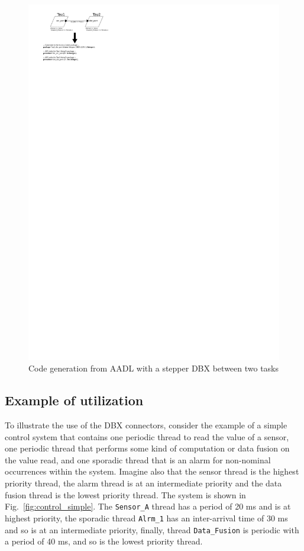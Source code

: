 \begin{figure}
\centering
\includegraphics[scale=1.8]{figs/transform}
\caption{Code generation from AADL with a stepper DBX between two
  tasks}
\label{fig:transformation}
\end{figure}

\subsection{Example of utilization}
To illustrate the use of the DBX connectors, consider the example of a
simple control system that contains one periodic thread to read the
value of a sensor, one periodic thread that performs some kind of
computation or data fusion on the value read, and one sporadic thread
that is an alarm for non-nominal occurrences within the
system. Imagine also that the sensor thread is the highest priority
thread, the alarm thread is at an intermediate priority and the data
fusion thread is the lowest priority thread. The system is shown in
Fig.~\ref{fig:control_simple}. The \texttt{Sensor\_A} thread has a
period of 20 ms and is at highest priority, the sporadic thread
\texttt{Alrm\_1} has an inter-arrival time of 30 ms and so is at an
intermediate priority, finally, thread \texttt{Data\_Fusion} is
periodic with a period of 40 ms, and so is the lowest priority thread.

